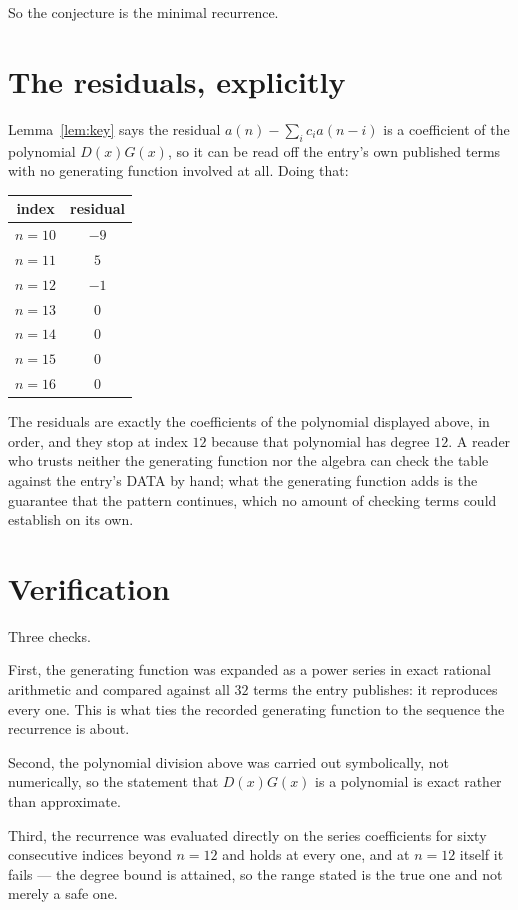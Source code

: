 \documentclass[11pt,a4paper]{article}
\theoremstyle{plain}
\theoremstyle{definition}
\begin{document}
So the conjecture is the minimal recurrence.

\section{The residuals, explicitly}

Lemma~\ref{lem:key} says the residual $a(n)-\sum_ic_ia(n-i)$ is a coefficient of the
polynomial $D(x)G(x)$, so it can be read off the entry's own published terms with no
generating function involved at all. Doing that:
\begin{center}
\begin{tabular}{cc}
index & residual \\ \hline
$n=10$ & $-9$ \\
$n=11$ & $5$ \\
$n=12$ & $-1$ \\
$n=13$ & $0$ \\
$n=14$ & $0$ \\
$n=15$ & $0$ \\
$n=16$ & $0$
\end{tabular}
\end{center}
The residuals are exactly the coefficients of the polynomial displayed above, in order, and
they stop at index $12$ because that polynomial has degree $12$. A reader who trusts
neither the generating function nor the algebra can check the table against the entry's DATA
by hand; what the generating function adds is the guarantee that the pattern continues, which
no amount of checking terms could establish on its own.

\section{Verification}

Three checks.

First, the generating function was expanded as a power series in exact rational arithmetic and
compared against all $32$ terms the entry publishes: it reproduces every one. This is
what ties the recorded generating function to the sequence the recurrence is about.

Second, the polynomial division above was carried out symbolically, not numerically, so the
statement that $D(x)G(x)$ is a polynomial is exact rather than approximate.

Third, the recurrence was evaluated directly on the series coefficients for sixty consecutive
indices beyond $n=12$ and holds at every one, and at $n=12$ itself it fails --- the
degree bound is attained, so the range stated is the true one and not merely a safe one.
\end{document}
